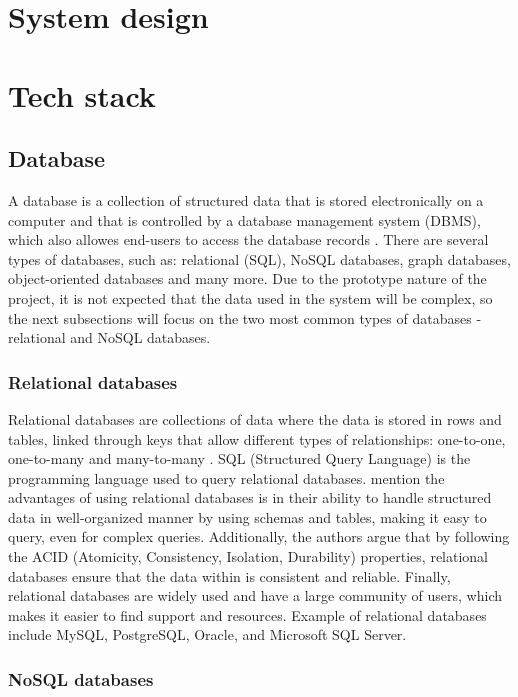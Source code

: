 \section{System design}

\section{Tech stack}

\subsection{Database}

A database is a collection of structured data that is stored electronically on a computer and that is controlled by a database management system (DBMS), which also allowes end-users to access the database records \parencite{databases2}. There are several types of databases, such as: relational (SQL), NoSQL databases, graph databases, object-oriented databases and many more. Due to the prototype nature of the project, it is not expected that the data used in the system will be complex, so the next subsections will focus on the two most common types of databases - relational and NoSQL databases.

\subsubsection{Relational databases}

Relational databases are collections of data where the data is stored in rows and tables, linked through keys that allow different types of relationships: one-to-one, one-to-many and many-to-many \parencite{databases}. SQL (Structured Query Language) is the programming language used to query relational databases. \textcite{databases} mention the advantages of using relational databases is in their ability to handle structured data in well-organized manner by using schemas and tables, making it easy to query, even for complex queries. Additionally, the authors argue that by following the ACID (Atomicity, Consistency, Isolation, Durability) properties, relational databases ensure that the data within is consistent and reliable. Finally, relational databases are widely used and have a large community of users, which makes it easier to find support and resources. Example of relational databases include MySQL, PostgreSQL, Oracle, and Microsoft SQL Server.

\subsubsection{NoSQL databases}

